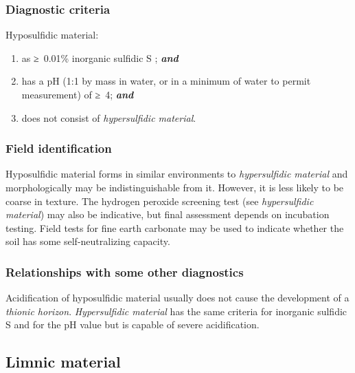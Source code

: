 \documentclass[
  letterpaper,
  DIV=11,
  numbers=noendperiod]{scrreprt}
\providecommand{\tightlist}{%
  \setlength{\itemsep}{0pt}\setlength{\parskip}{0pt}}\usepackage{longtable,booktabs,array}
\begin{document}
\hypertarget{diagnostic-criteria-65}{%
\subsubsection{Diagnostic criteria}\label{diagnostic-criteria-65}}

Hyposulfidic material:

\begin{enumerate}
\def\labelenumi{\arabic{enumi}.}
\tightlist
\item
  as ≥~0.01\% inorganic sulfidic S ; \textbf{\emph{and}}
\item
  has a pH (1:1 by mass in water, or in a minimum of water to permit
  measurement) of ≥~4; \textbf{\emph{and}}
\item
  does not consist of \emph{hypersulfidic material}.
\end{enumerate}

\hypertarget{field-identification-44}{%
\subsubsection{Field identification}\label{field-identification-44}}

Hyposulfidic material forms in similar environments to
\emph{hypersulfidic material} and morphologically may be
indistinguishable from it. However, it is less likely to be coarse in
texture. The hydrogen peroxide screening test (see \emph{hypersulfidic
material}) may also be indicative, but final assessment depends on
incubation testing. Field tests for fine earth carbonate may be used to
indicate whether the soil has some self-neutralizing capacity.

\hypertarget{relationships-with-some-other-diagnostics-58}{%
\subsubsection{Relationships with some other
diagnostics}\label{relationships-with-some-other-diagnostics-58}}

Acidification of hyposulfidic material usually does not cause the
development of a \emph{thionic horizon}. \emph{Hypersulfidic material}
has the same criteria for inorganic sulfidic S and for the pH value but
is capable of severe acidification.

\hypertarget{limnic-material}{%
\subsection{Limnic material}\label{limnic-material}}
\end{document}
